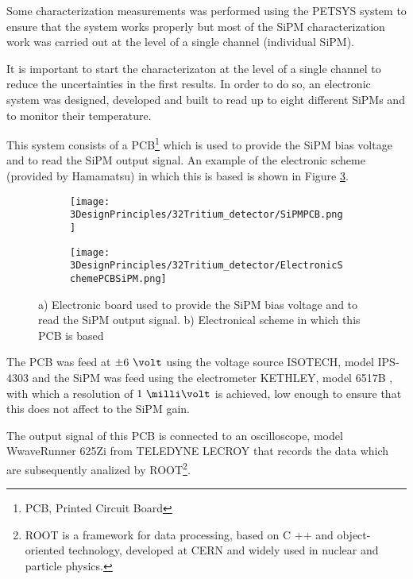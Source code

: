 Some characterization measurements was performed using the PETSYS system to ensure that the system works properly but most of the SiPM characterization work was carried out at the level of a single channel (individual SiPM).

It is important to start the characterizaton at the level of a single channel to reduce the uncertainties in the first results. In order to do so, an electronic system was designed, developed and built to read up to eight different SiPMs and to monitor their temperature.

This system consists of a PCB\footnote{PCB, Printed Circuit Board} which is used to provide the SiPM bias voltage and to read the SiPM output signal. An example of the electronic scheme (provided by Hamamatsu) in which this is based is shown in Figure \ref{fig:PCBSiPM}.

\begin{figure}
\centering
    \begin{subfigure}[b]{0.5\textwidth}
    \centering
    \texttt{[image: 3DesignPrinciples/32Tritium\_detector/SiPMPCB.png]}  
    \caption{\label{subfig:ElectronicBoardSiPM}}
    \end{subfigure}
    \hfill
    \begin{subfigure}[b]{0.45\textwidth}
    \centering
    \texttt{[image: 3DesignPrinciples/32Tritium\_detector/ElectronicSchemePCBSiPM.png]}  
    \caption{\label{subfig:ElectronicSchemePCBSiPM}}
    \end{subfigure}
    \hfill
 \caption{a) Electronic board used to provide the SiPM bias voltage and to read the SiPM output signal. b) Electronical scheme in which this PCB is based}
 \label{fig:PCBSiPM}
\end{figure}

The PCB was feed at $\pm6~\volt$ using the voltage source ISOTECH, model IPS-4303 \cite{VoltageSourceISOTECH} and the SiPM was feed using the electrometer KETHLEY, model 6517B \cite{VoltageSourceKethley}, with which a resolution of $1~\milli\volt$ is achieved, low enough to ensure that this does not affect to the SiPM gain.

The output signal of this PCB is connected to an oscilloscope, model WwaveRunner 625Zi from TELEDYNE LECROY \cite{OscilloscopeIFIMED} that records the data which are subsequently analized by ROOT\footnote{ROOT is a framework for data processing, based on C ++ and object-oriented technology, developed at CERN and widely used in nuclear and particle physics.}.